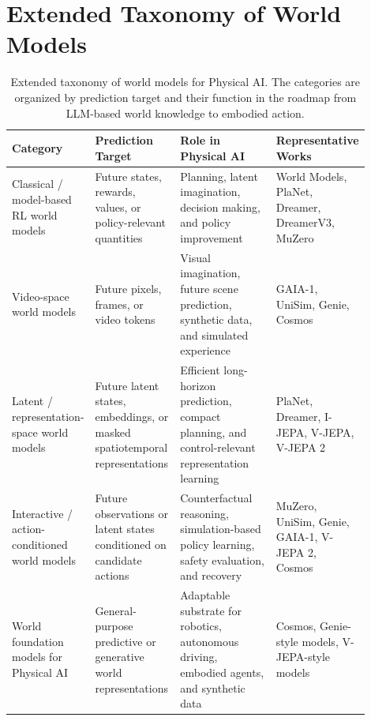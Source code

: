 \section{Extended Taxonomy of World Models}
\label{app:world-models}

\begin{table}[t]
\centering
\small
\begin{tabular}{p{0.17\linewidth}p{0.24\linewidth}p{0.30\linewidth}p{0.19\linewidth}}
\toprule
Category & Prediction Target & Role in Physical AI & Representative Works \\
\midrule
Classical / model-based RL world models 
& Future states, rewards, values, or policy-relevant quantities
& Planning, latent imagination, decision making, and policy improvement
& World Models, PlaNet, Dreamer, DreamerV3, MuZero~\citep{ha2018world,hafner2019planet,hafner2020dreamer,hafner2023dreamerv3,schrittwieser2020mastering} \\
\midrule
Video-space world models 
& Future pixels, frames, or video tokens
& Visual imagination, future scene prediction, synthetic data, and simulated experience
& GAIA-1, UniSim, Genie, Cosmos~\citep{hu2023gaia,yang2023unisim,bruce2024genie,agarwal2025cosmos} \\
\midrule
Latent / representation-space world models
& Future latent states, embeddings, or masked spatiotemporal representations
& Efficient long-horizon prediction, compact planning, and control-relevant representation learning
& PlaNet, Dreamer, I-JEPA, V-JEPA, V-JEPA 2~\citep{hafner2019planet,hafner2020dreamer,assran2023ijepa,bardes2024vjepa,assran2025vjepa2} \\
\midrule
Interactive / action-conditioned world models
& Future observations or latent states conditioned on candidate actions
& Counterfactual reasoning, simulation-based policy learning, safety evaluation, and recovery
& MuZero, UniSim, Genie, GAIA-1, V-JEPA 2, Cosmos~\citep{schrittwieser2020mastering,yang2023unisim,bruce2024genie,hu2023gaia,assran2025vjepa2,agarwal2025cosmos} \\
\midrule
World foundation models for Physical AI
& General-purpose predictive or generative world representations
& Adaptable substrate for robotics, autonomous driving, embodied agents, and synthetic data
& Cosmos, Genie-style models, V-JEPA-style models~\citep{agarwal2025cosmos,bruce2024genie,bardes2024vjepa,assran2025vjepa2} \\
\bottomrule
\end{tabular}
\caption{Extended taxonomy of world models for Physical AI. The categories are organized by prediction target and their function in the roadmap from LLM-based world knowledge to embodied action.}
\label{tab:world-model-taxonomy}
\end{table}


